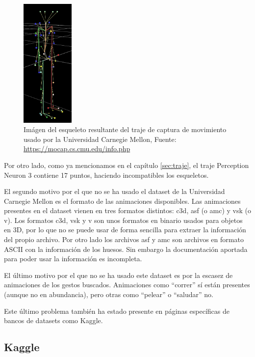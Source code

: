 \begin{figure}[H]
    \centering
    \includegraphics[width=0.23\textwidth]{Imagenes/Bitmap/MCUEsqueleto.jpg}
    \caption{Imágen del esqueleto resultante del traje de captura de movimiento usado por la Universidad Carnegie Mellon, Fuente: \url{https://mocap.cs.cmu.edu/info.php}}
    \label{fig:MCUEsqueleto}
\end{figure}

Por otro lado, como ya mencionamos en el capítulo \ref{sec:traje}, el traje Perception Neuron 3 contiene 17 puntos, haciendo incompatibles los esqueletos.

El segundo motivo por el que no se ha usado el dataset de la Universidad Carnegie Mellon es el formato de las animaciones disponibles.
Las animaciones presentes en el dataset vienen en tres formatos distintos: c3d, asf (o amc) y vsk (o v).
Los formatos c3d, vsk y v son unos formatos en binario usados para objetos en 3D, por lo que no se puede usar de forma sencilla para extraer la información del propio archivo.
Por otro lado los archivos asf y amc son archivos en formato ASCII con la información de los huesos. Sin embargo la documentación aportada para poder usar la información es incompleta.

El último motivo por el que no se ha usado este dataset es por la escasez de animaciones de los gestos buscados.
Animaciones como ``correr'' sí están presentes (aunque no en abundancia), pero otras como ``pelear'' o ``saludar'' no.

Este último problema también ha estado presente en páginas específicas de bancos de datasets como Kaggle.

\subsection{Kaggle}


